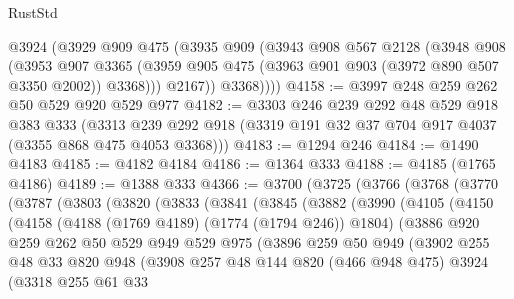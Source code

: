 \begin{lexlean}{RustStd}
\begin{coremodule}
          @3924
          (@3929
            @909
            @475
            (@3935
              @909
              (@3943
                @908
                @567
                @2128
                (@3948
                  @908
                  (@3953
                    @907
                    @3365
                    (@3959 @905 @475 (@3963 @901 @903 (@3972 @890 @507 @3350 @2002)) @3368)))
                @2167))
            @3368))))
@4158 := @3997 @248 @259 @262 @50 @529 @920 @529 @977
@4182 := @3303
    @246
    @239
    @292
    @48
    @529
    @918
    @383
    @333
    (@3313 @239 @292 @918 (@3319 @191 @32 @37 @704 @917 @4037 (@3355 @868 @475 @4053 @3368)))
@4183 := @1294 @246
@4184 := @1490 @4183
@4185 := @4182 @4184
@4186 := @1364 @333
@4188 := @4185 (@1765 @4186)
@4189 := @1388 @333
@4366 := @3700
    (@3725
      (@3766
        (@3768
          (@3770
            (@3787
              (@3803
                (@3820
                  (@3833
                    (@3841
                      (@3845
                        (@3882
                          (@3990
                            (@4105
                              (@4150
                                (@4158
                                  (@4188 (@1769 @4189) (@1774 (@1794 @246)) @1804)
                                  (@3886
                                    @920
                                    @259
                                    @262
                                    @50
                                    @529
                                    @949
                                    @529
                                    @975
                                    (@3896
                                      @259
                                      @50
                                      @949
                                      (@3902
                                        @255
                                        @48
                                        @33
                                        @820
                                        @948
                                        (@3908
                                          @257
                                          @48
                                          @144
                                          @820
                                          (@466 @948 @475)
                                          @3924
                                          (@3318
                                            @255
                                            @61
                                            @33

\end{coremodule}
\end{lexlean}
